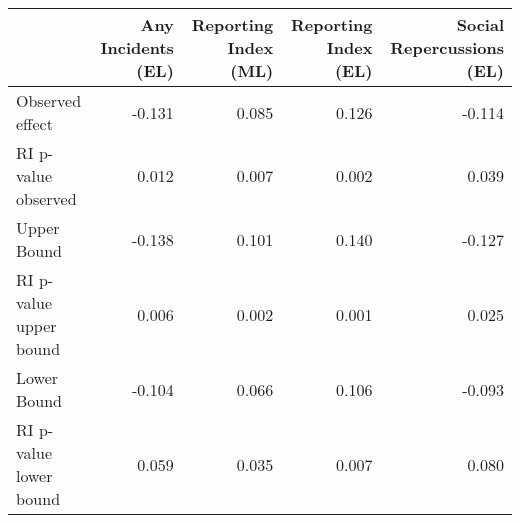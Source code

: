 
\begin{tabular}{l|r|r|r|r}
\hline
  & Any Incidents (EL) & Reporting Index (ML) & Reporting Index (EL) & Social Repercussions (EL)\\
\hline
Observed effect & -0.131 & 0.085 & 0.126 & -0.114\\
\hline
RI p-value observed & 0.012 & 0.007 & 0.002 & 0.039\\
\hline
Upper Bound & -0.138 & 0.101 & 0.140 & -0.127\\
\hline
RI p-value upper bound & 0.006 & 0.002 & 0.001 & 0.025\\
\hline
Lower Bound & -0.104 & 0.066 & 0.106 & -0.093\\
\hline
RI p-value lower bound & 0.059 & 0.035 & 0.007 & 0.080\\
\hline
\end{tabular}
